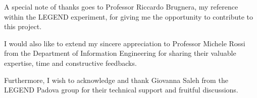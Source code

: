 \documentclass[a4paper,11pt]{book}
\begin{document}
A special note of thanks goes to Professor Riccardo Brugnera, my reference within the LEGEND experiment, for giving me the opportunity to contribute to this project.

I would also like to extend my sincere appreciation to Professor Michele Rossi from the Department of Information Engineering for sharing their valuable expertise, time and constructive feedbacks.

Furthermore, I wish to acknowledge and thank Giovanna Saleh from the LEGEND Padova group for their technical support and fruitful discussions.


\end{document}
